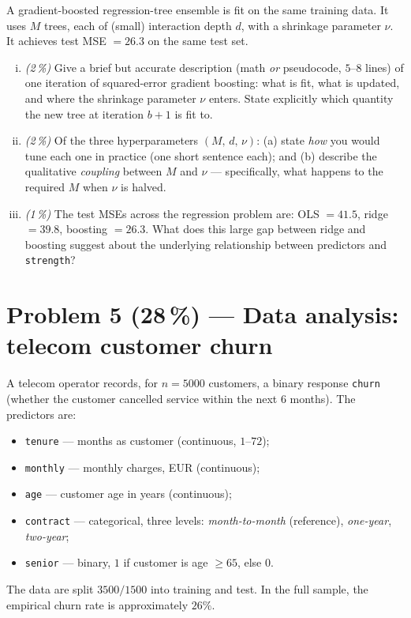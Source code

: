 \documentclass[11pt,a4paper]{article}
\newcommand{\points}[1]{\textbf{(#1\,\%)}}
\newcommand{\subpoints}[1]{\textit{(#1\,\%)}}
\begin{document}
A gradient-boosted regression-tree ensemble is fit on the same training data. It uses $M$ trees, each of (small) interaction depth $d$, with a shrinkage parameter $\nu$. It achieves test MSE $= 26.3$ on the same test set.

\begin{enumerate}[(i)]
  \item \subpoints{2} Give a brief but accurate description (math \emph{or} pseudocode, $5$--$8$ lines) of one iteration of squared-error gradient boosting: what is fit, what is updated, and where the shrinkage parameter $\nu$ enters. State explicitly which quantity the new tree at iteration $b+1$ is fit to.
  \item \subpoints{2} Of the three hyperparameters $(M,\, d,\, \nu)$: (a) state \emph{how} you would tune each one in practice (one short sentence each); and (b) describe the qualitative \emph{coupling} between $M$ and $\nu$ --- specifically, what happens to the required $M$ when $\nu$ is halved.
  \item \subpoints{1} The test MSEs across the regression problem are: OLS $= 41.5$, ridge $= 39.8$, boosting $= 26.3$. What does this large gap between ridge and boosting suggest about the underlying relationship between predictors and \texttt{strength}?
\end{enumerate}

\vfill\eject

\section*{Problem 5 \points{28} --- Data analysis: telecom customer churn}

A telecom operator records, for $n=5000$ customers, a binary response \texttt{churn} (whether the customer cancelled service within the next $6$ months). The predictors are:
\begin{itemize}
  \item \texttt{tenure} --- months as customer (continuous, $1$--$72$);
  \item \texttt{monthly} --- monthly charges, EUR (continuous);
  \item \texttt{age} --- customer age in years (continuous);
  \item \texttt{contract} --- categorical, three levels: \emph{month-to-month} (reference), \emph{one-year}, \emph{two-year};
  \item \texttt{senior} --- binary, $1$ if customer is age $\ge 65$, else $0$.
\end{itemize}
The data are split $3500/1500$ into training and test. In the full sample, the empirical churn rate is approximately $26\%$.
\end{document}
